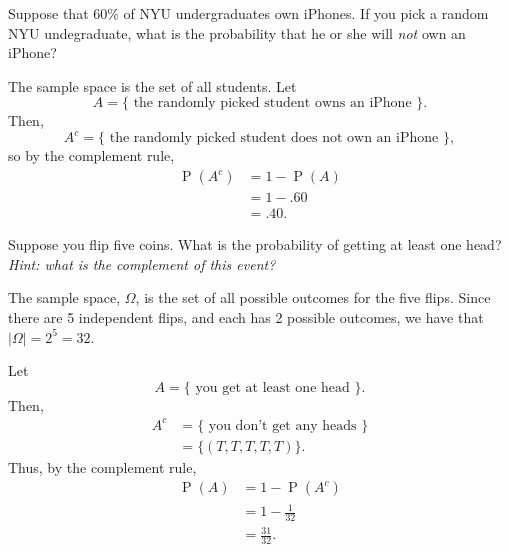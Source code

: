 \documentclass[answers,11pt]{exam}
\DeclareMathOperator*{\Prob}{P}
\renewcommand{\Pr}{\Prob}
\begin{document}
\begin{questions}
\begin{parts}
\end{parts}



\newpage



\question Suppose that 60\% of NYU undergraduates own iPhones.  If you pick a
random NYU undegraduate, what is the probability that he or she will \emph{not} own
an iPhone?

\begin{solution}
The sample space is the set of all students.  Let
\[
  A = \{ \text{ the randomly picked student owns an iPhone } \}.
\]
Then,
\[
  A^c = \{ \text{ the randomly picked student does not own an iPhone } \},
\]
so by the complement rule,
\begin{align*}
  \Pr(A^c) &= 1 - \Pr(A) \\
           &= 1 - .60 \\
           &= .40.
\end{align*}
\end{solution}



\question Suppose you flip five coins.  What is the probability of getting at
least one head?
\\
\textit{Hint: what is the complement of this event?}

\begin{solution}
The sample space, $\Omega$, is the set of all possible outcomes for the five flips.
Since there are 5 independent flips, and each has 2 possible outcomes, we have
that $|\Omega| = 2^5 = 32$.

Let
\[
  A = \{ \text{ you get at least one head } \}.
\]
Then,
\begin{align*}
  A^c &= \{ \text{ you don't get any heads } \} \\
      &= \{ (T,T,T,T,T) \}.
\end{align*}
Thus, by the complement rule,
\begin{align*}
  \Pr(A) &= 1 - \Pr(A^c) \\
         &= 1 - \tfrac{1}{32} \\
         &= \tfrac{31}{32}.
\end{align*}
\end{solution}




\end{questions}
\end{document}
